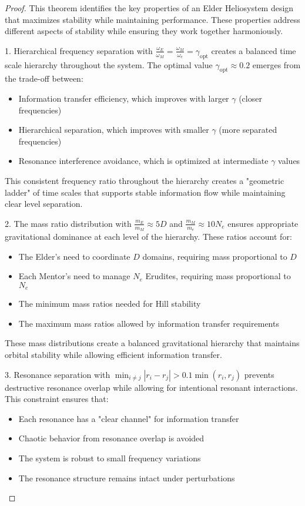 \begin{proof}
This theorem identifies the key properties of an Elder Heliosystem design that maximizes stability while maintaining performance. These properties address different aspects of stability while ensuring they work together harmoniously.

1. Hierarchical frequency separation with $\frac{\omega_E}{\omega_M} = \frac{\omega_M}{\omega_e} = \gamma_{\text{opt}}$ creates a balanced time scale hierarchy throughout the system. The optimal value $\gamma_{\text{opt}} \approx 0.2$ emerges from the trade-off between:
\begin{itemize}
    \item Information transfer efficiency, which improves with larger $\gamma$ (closer frequencies)
    \item Hierarchical separation, which improves with smaller $\gamma$ (more separated frequencies)
    \item Resonance interference avoidance, which is optimized at intermediate $\gamma$ values
\end{itemize}

This consistent frequency ratio throughout the hierarchy creates a "geometric ladder" of time scales that supports stable information flow while maintaining clear level separation.

2. The mass ratio distribution with $\frac{m_E}{m_M} \approx 5D$ and $\frac{m_M}{m_e} \approx 10N_e$ ensures appropriate gravitational dominance at each level of the hierarchy. These ratios account for:
\begin{itemize}
    \item The Elder's need to coordinate $D$ domains, requiring mass proportional to $D$
    \item Each Mentor's need to manage $N_e$ Erudites, requiring mass proportional to $N_e$
    \item The minimum mass ratios needed for Hill stability
    \item The maximum mass ratios allowed by information transfer requirements
\end{itemize}

These mass distributions create a balanced gravitational hierarchy that maintains orbital stability while allowing efficient information transfer.

3. Resonance separation with $\min_{i \neq j} |r_i - r_j| > 0.1 \min(r_i, r_j)$ prevents destructive resonance overlap while allowing for intentional resonant interactions. This constraint ensures that:
\begin{itemize}
    \item Each resonance has a "clear channel" for information transfer
    \item Chaotic behavior from resonance overlap is avoided
    \item The system is robust to small frequency variations
    \item The resonance structure remains intact under perturbations
\end{itemize}


\end{proof}
